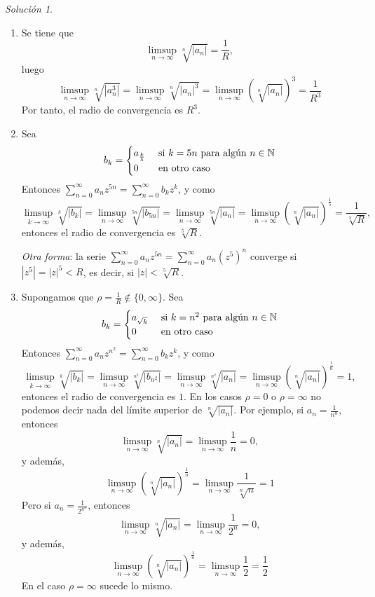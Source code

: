 \documentclass[11pt]{report}
\newcommand{\N}{\mathbb N}
\newcommand{\serie}[2][0]{\sum_{n=#1}^\infty #2}
\theoremstyle{remark}
\newtheorem*{resolution}{Solución}
\begin{document}
\begin{resolution}
\hfill
\begin{enumerate}
    \item Se tiene que
    \[\limsup_{n \to \infty} \sqrt[n]{|a_n|} = \frac{1}{R},\]
    luego
    \[\limsup_{n \to \infty} \sqrt[n]{|a_n^3|} = \limsup_{n \to \infty} \sqrt[n]{|a_n|^3} = \limsup_{n \to \infty} \left(\sqrt[n]{|a_n|}\right)^3 = \frac{1}{R^3}\]
    Por tanto, el radio de convergencia es $R^3$.
    \item Sea
    \[b_k = \begin{cases}
        a_{\frac{k}{5}} & $ si $ k = 5n $ para algún $ n \in \N \\
        0 & $ en otro caso$
    \end{cases}\]
    Entonces $\serie{a_nz^{5n}} = \serie{b_kz^k}$, y como
    \[\limsup_{k \to \infty} \sqrt[k]{|b_k|} = \limsup_{n \to \infty} \sqrt[5n]{|b_{5n}|} = \limsup_{n \to \infty} \sqrt[5n]{|a_n|} = \limsup_{n \to \infty} \left(\sqrt[n]{|a_n|}\right)^{\frac{1}{5}} = \frac{1}{\sqrt[5]{R}},\]
    entonces el radio de convergencia es $\sqrt[5]{R}$.

    \textit{Otra forma}: la serie $\serie{a_n}z^{5n} = \serie{a_n}(z^5)^n$ converge si $|z^5| = |z|^5<R$, es decir, si $|z| < \sqrt[5]{R}$.
    \item Supongamos que $\rho = \frac{1}{R} \not\in \{0,\infty\}$. Sea
    \[b_k = \begin{cases}
        a_{\sqrt{k}} & $ si $ k = n^2 $ para algún $ n \in \N \\
        0 & $ en otro caso$
    \end{cases}\]
    Entonces $\serie{a_nz^{n^2}} = \serie{b_kz^k}$, y como
    \[\limsup_{k \to \infty} \sqrt[k]{|b_k|} = \limsup_{n \to \infty} \sqrt[n^2]{|b_{n^2}|} = \limsup_{n \to \infty} \sqrt[n^2]{|a_n|} = \limsup_{n \to \infty} \left(\sqrt[n]{|a_n|}\right)^{\frac{1}{n}} = 1,\]
    entonces el radio de convergencia es $1$. En los casos $\rho = 0$ o $\rho= \infty$ no podemos decir nada del límite superior de $\sqrt[n]{|a_n|}$. Por ejemplo, si $a_n = \frac{1}{n^n}$, entonces
    \[\limsup_{n \to \infty} \sqrt[n]{|a_n|} =\limsup_{n \to \infty} \frac{1}{n} =0,\]
    y además,
    \[\limsup_{n \to \infty} \left(\sqrt[n]{|a_n|}\right)^{\frac{1}{n}} = \limsup_{n \to \infty}\frac{1}{\sqrt[n]{n}} = 1\]
    Pero si $a_n = \frac{1}{2^{n^n}}$, entonces
    \[\limsup_{n \to \infty} \sqrt[n]{|a_n|} = \limsup_{n \to \infty} \frac{1}{2^n} = 0,\]
    y además,
    \[\limsup_{n \to \infty} \left(\sqrt[n]{|a_n|}\right)^{\frac{1}{n}} = \limsup_{n \to \infty}\frac{1}{2} = \frac{1}{2}\]
    En el caso $\rho = \infty$ sucede lo mismo.
\end{enumerate}
\end{resolution}
\end{document}
